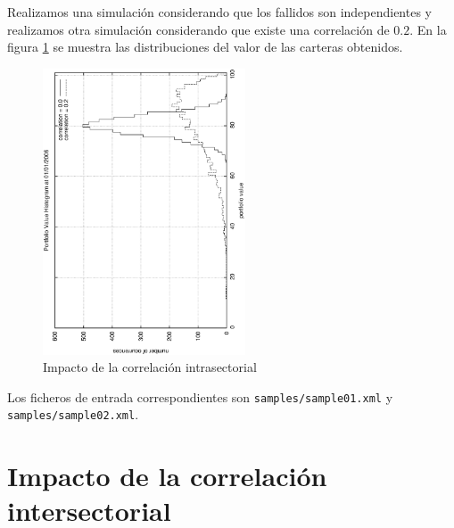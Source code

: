 Realizamos una simulaci\'on considerando que los fallidos son independientes y 
realizamos otra simulaci\'on considerando que existe una correlaci\'on de
$0.2$. En la figura \ref{sectorcorrel} se muestra las distribuciones del 
valor de las carteras obtenidos.

\begin{figure}[!hb]
\begin{center}
\includegraphics[width=6cm,angle=-90]{./samples/sectorcorrel.ps}
\caption{Impacto de la correlaci\'on intrasectorial}
\label{sectorcorrel}
\end{center}
\end{figure}

Los ficheros de entrada correspondientes son \verb+samples/sample01.xml+ y 
\verb+samples/sample02.xml+.

\section{Impacto de la correlaci\'on intersectorial}

